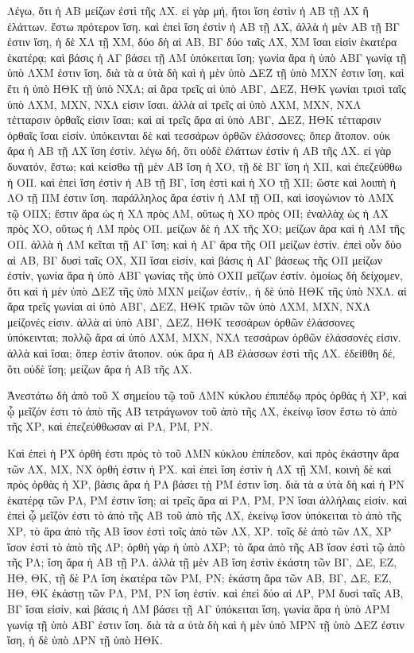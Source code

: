 \begin{Parallel}{}{}
{{\greekfont Λέγω,
ὅτι ἡ ΑΒ μείζων ἐστὶ τῆς ΛΧ. εἰ γὰρ μή, ἤτοι ἴση
ἐστὶν ἡ ΑΒ τῇ ΛΧ ἢ ἐλάττων. ἔστω πρότερον ἴση. καὶ
ἐπεὶ ἴση ἐστὶν ἡ ΑΒ τῇ ΛΧ, ἀλλὰ ἡ μὲν ΑΒ τῇ ΒΓ ἐστιν
ἴση, ἡ δὲ ΧΛ τῇ ΧΜ, δύο δὴ αἱ ΑΒ, ΒΓ δύο ταῖς ΛΧ, ΧΜ
ἴσαι εἰσὶν ἑκατέρα ἑκατέρᾳ; καὶ βάσις ἡ ΑΓ βάσει τῇ ΛΜ ὑπόκειται ἴση; γωνία ἄρα ἡ ὑπὸ ΑΒΓ γωνίᾳ τῇ ὑπὸ
ΛΧΜ ἐστιν ἴση. διὰ τὰ α ὐτὰ δὴ καὶ ἡ μὲν ὑπὸ ΔΕΖ
τῇ ὑπὸ ΜΧΝ ἐστιν ἴση, καὶ ἔτι ἡ ὑπὸ ΗΘΚ τῇ ὑπὸ
ΝΧΛ; αἱ ἄρα τρεῖς αἱ ὑπὸ ΑΒΓ, ΔΕΖ, ΗΘΚ γωνίαι τρισὶ
ταῖς ὑπὸ ΛΧΜ, ΜΧΝ, ΝΧΛ εἰσιν ἴσαι. ἀλλὰ αἱ τρεῖς αἱ
ὑπὸ ΛΧΜ, ΜΧΝ, ΝΧΛ τέτταρσιν ὀρθαῖς εἰσιν ἴσαι;
καὶ αἱ τρεῖς ἄρα αἱ ὑπὸ ΑΒΓ, ΔΕΖ, ΗΘΚ τέτταρσιν ὀρθαῖς
ἴσαι εἰσίν. ὑπόκεινται δὲ καὶ τεσσάρων ὀρθῶν ἐλάσσονες;
ὅπερ ἄτοπον. οὐκ ἄρα ἡ ΑΒ τῇ ΛΧ ἴση ἐστίν. λέγω δή,
ὅτι οὑδὲ ἐλάττων ἐστὶν ἡ ΑΒ τῆς ΛΧ. εἰ γὰρ δυνατόν,
ἔστω; καὶ κείσθω τῇ μὲν ΑΒ ἴση ἡ ΧΟ, τῇ δὲ ΒΓ ἴση
ἡ ΧΠ, καὶ ἐπεζεύθθω ἡ ΟΠ. καὶ ἐπεὶ ἴση ἐστὶν ἡ ΑΒ
τῇ ΒΓ, ἴση ἐστὶ καὶ ἡ ΧΟ τῇ ΧΠ; ὥστε καὶ λοιπὴ ἡ ΛΟ
τῇ ΠΜ ἐστιν ἴση. παράλληλος ἄρα ἐστὶν ἡ ΛΜ τῇ ΟΠ, καὶ
ἰσογώνιον τὸ ΛΜΧ τῷ ΟΠΧ; ἔστιν ἄρα ὡς ἡ ΧΛ
πρὸς ΛΜ, οὕτως ἡ ΧΟ πρὸς ΟΠ; ἐναλλὰχ ὡς ἡ ΛΧ πρὸς
ΧΟ, οὕτως ἡ ΛΜ πρὸς ΟΠ. μείζων δὲ ἡ ΛΧ τῆς ΧΟ; μείζων
ἄρα καὶ ἡ ΛΜ τῆς ΟΠ. ἀλλὰ ἡ ΛΜ κεῖται τῇ ΑΓ ἴση; καὶ
ἡ ΑΓ ἄρα τῆς ΟΠ μείζων ἐστίν. ἐπεὶ οὖν δύο αἱ ΑΒ, ΒΓ
δυσὶ ταῖς ΟΧ, ΧΠ ἴσαι εἰσίν, καὶ βάσις ἡ ΑΓ βάσεως τῆς ΟΠ
μείζων ἐστίν, γωνία ἄρα ἡ ὑπὸ ΑΒΓ γωνίας τῆς ὑπὸ
ΟΧΠ μεῖζων ἐστίν. ὁμοίως δὴ δείχομεν, ὅτι καὶ ἡ μὲν
ὑπὸ ΔΕΖ τῆς ὑπὸ ΜΧΝ μείζων ἐστίν,, ἡ δὲ ὑπὸ
ΗΘΚ τῆς ὑπὸ ΝΧΛ. αἱ ἄρα τρεῖς γωνίαι αἱ ὑπὸ ΑΒΓ, ΔΕΖ, ΗΘΚ
τριῶν τῶν ὑπὸ ΛΧΜ, ΜΧΝ, ΝΧΛ μείζονές εἰσιν. ἀλλὰ αἱ ὑπὸ
ΑΒΓ, ΔΕΖ, ΗΘΚ τεσσάρων ὀρθῶν ἐλάσσονες ὑπόκεινται; πολλῷ
ἄρα αἱ ὑπὸ ΛΧΜ, ΜΧΝ, ΝΧΛ τεσσάρων ὀρθῶν ἐλάσσονές εἰσιν.
ἀλλὰ καὶ ἴσαι; ὅπερ ἐστὶν ἄτοπον. οὐκ ἄρα ἡ ΑΒ ἐλάσσων
ἐστὶ τῆς ΛΧ. ἐδείθθη δέ, ὅτι οὐδὲ ἴση; μείζων ἄρα ἡ ΑΒ
τῆς ΛΧ.}

{\greekfont Ἀνεστάτω δὴ ἀπὸ τοῦ Χ σημείου τῷ τοῦ ΛΜΝ κύκλου
ἐπιπέδῳ πρὸς ὀρθὰς ἡ ΧΡ, καὶ ᾧ μεῖζόν ἐστι τὸ ἀπὸ τῆς
ΑΒ τετράγωνον τοῦ ἀπὸ τῆς ΛΧ, ἐκείνῳ ἴσον ἔστω τὸ
ἀπὸ τῆς ΧΡ, καὶ ἐπεζεύθθωσαν αἱ ΡΛ, ΡΜ, ΡΝ.}

{\greekfont Καὶ ἐπεὶ ἡ ΡΧ ὀρθὴ ἐστι πρὸς τὸ τοῦ ΛΜΝ κύκλου
ἐπίπεδον, καὶ πρὸς ἑκάστην ἄρα τῶν ΛΧ, ΜΧ, ΝΧ
ὀρθή ἐστιν ἡ ΡΧ.
 καὶ ἐπεὶ ἴση
ἐστὶν ἡ ΛΧ τῇ ΧΜ, κοινὴ δὲ καὶ πρὸς ὀρθὰς ἡ ΧΡ, βάσις ἄρα
ἡ ΡΛ βάσει τῂ ΡΜ ἐστιν ἴση. διὰ τὰ α ὐτὰ δὴ καὶ ἡ ΡΝ
ἑκατέρᾳ τῶν ΡΛ, ΡΜ ἐστιν ἴση; αἱ τρεῖς ἄρα αἱ ΡΛ,
ΡΜ, ΡΝ ἴσαι ἀλλήλαις εἰσίν. καὶ ἐπεὶ ᾧ μεῖζόν
ἐστι τὸ ἀπὸ τῆς ΑΒ τοῦ ἀπὸ τῆς ΛΧ, ἐκείνῳ
ἴσον ὑπόκειται τὸ ἀπὸ τῆς ΧΡ, τὸ ἄρα ἀπὸ τῆς ΑΒ ἴσον
ἐστὶ τοῖς ἀπὸ τῶν ΛΧ, ΧΡ.  τοῖς δὲ ἀπὸ τῶν ΛΧ, ΧΡ
ἴσον ἐστὶ τὸ ἀπὸ τῆς ΛΡ; ὀρθὴ γὰρ ἡ ὑπὸ ΛΧΡ;
τὸ ἄρα ἀπὸ τῆς ΑΒ ἴσον ἐστὶ τῷ ἀπὸ τῆς ΡΛ;
ἴση ἄρα ἡ ΑΒ τῇ ΡΛ. ἀλλὰ τῇ μὲν ΑΒ ἴση ἐστὶν ἑκάστη
τῶν ΒΓ, ΔΕ, ΕΖ, ΗΘ, ΘΚ, τῇ δὲ ΡΛ ἴση ἑκατέρα τῶν
ΡΜ, ΡΝ;  ἑκάστη ἄρα τῶν ΑΒ, ΒΓ, ΔΕ, ΕΖ, ΗΘ, ΘΚ 
ἑκάστῃ τῶν ΡΛ, ΡΜ, ΡΝ ἴση ἐστίν. καὶ ἐπεὶ δύο
αἱ ΛΡ, ΡΜ δυσὶ ταῖς ΑΒ, ΒΓ ἴσαι εἰσίν, καὶ βάσις ἡ ΛΜ
βάσει τῇ ΑΓ ὑπόκειται ἴση, γωνία ἄρα ἡ ὑπὸ ΛΡΜ
γωνίᾳ τῇ ὑπὸ ΑΒΓ ἐστιν ἴση. διὰ τὰ α ὐτὰ δὴ καὶ ἡ μὲν ὑπὸ
ΜΡΝ τῇ ὑπὸ ΔΕΖ ἐστιν ἴση, ἡ δὲ ὑπὸ ΛΡΝ τῇ ὑπὸ
ΗΘΚ.}

}
\end{Parallel}
